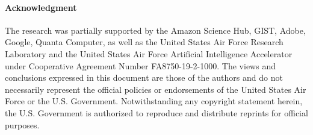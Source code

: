 \paragraph{Acknowledgment}
The research was partially supported by the Amazon Science Hub, GIST, Adobe, Google, Quanta Computer, as well as the United States Air Force Research Laboratory and the United States Air Force Artificial Intelligence Accelerator under Cooperative Agreement Number FA8750-19-2-1000. The views and conclusions expressed in this document are those of the authors and do not necessarily represent the official policies or endorsements of the United States Air Force or the U.S. Government. Notwithstanding any copyright statement herein, the U.S. Government is authorized to reproduce and distribute reprints for official purposes.
